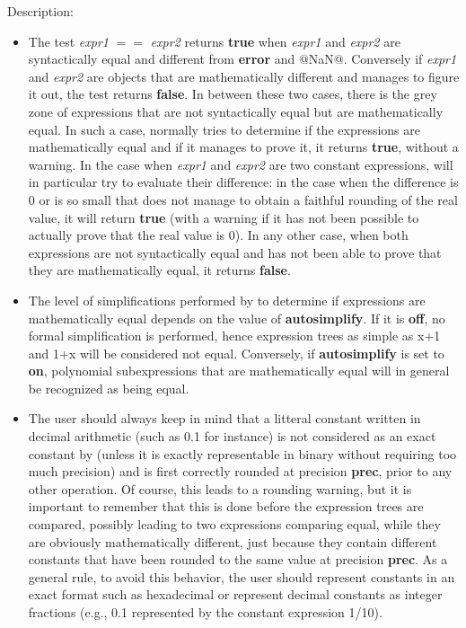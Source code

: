 \noindent Description: \begin{itemize}

\item The test \emph{expr1} \textbf{$==$} \emph{expr2} returns \textbf{true} when \emph{expr1} and \emph{expr2} are
   syntactically equal and different from \textbf{error} and @NaN@. Conversely if \emph{expr1}
   and \emph{expr2} are objects that are mathematically different and \sollya manages
   to figure it out, the test returns \textbf{false}. In between these two cases, there
   is the grey zone of expressions that are not syntactically equal but are
   mathematically equal. In such a case, \sollya normally tries to determine if
   the expressions are mathematically equal and if it manages to prove it, it
   returns \textbf{true}, without a warning. In the case when \emph{expr1} and \emph{expr2} are
   two constant expressions, \sollya will in particular try to evaluate their
   difference: in the case when the difference is 0 or is so small that \sollya
   does not manage to obtain a faithful rounding of the real value, it will
   return \textbf{true} (with a warning if it has not been possible to actually prove
   that the real value is 0). In any other case, when both expressions are not
   syntactically equal and \sollya has not been able to prove that they are
   mathematically equal, it returns \textbf{false}.

\item The level of simplifications performed by \sollya to determine if
   expressions are mathematically equal depends on the value of \textbf{autosimplify}.
   If it is \textbf{off}, no formal simplification is performed, hence expression trees
   as simple as x+1 and 1+x will be considered not equal. Conversely, if
   \textbf{autosimplify} is set to \textbf{on}, polynomial subexpressions that are mathematically
   equal will in general be recognized as being equal.

\item The user should always keep in mind that a litteral constant written in
   decimal arithmetic (such as 0.1 for instance) is not considered as an exact
   constant by \sollya (unless it is exactly representable in binary without
   requiring too much precision) and is first correctly rounded at precision
   \textbf{prec}, prior to any other operation. Of course, this leads to a rounding
   warning, but it is important to remember that this is done before the
   expression trees are compared, possibly leading to two expressions comparing
   equal, while they are obviously mathematically different, just because they
   contain different constants that have been rounded to the same value at
   precision \textbf{prec}. As a general rule, to avoid this behavior, the user should
   represent constants in an exact format such as hexadecimal or represent
   decimal constants as integer fractions (e.g., 0.1 represented by the constant
   expression 1/10).


\end{itemize}
